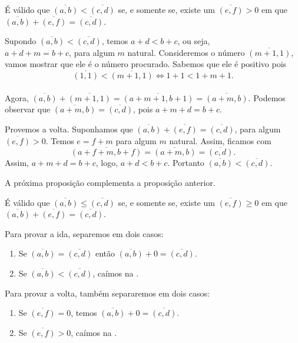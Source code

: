 \documentclass[../main.tex]{subfiles}
\begin{document}
\begin{prop}\label{int-prop-AMenorBAMaisCIgualB}
    É válido que $\overline{(a,b)} < \overline{(c,d)}$ se, e somente se, existe um $\overline{(e,f)} > 0$ em que  $\overline{(a,b)} + \overline{(e,f)} = \overline{(c,d)}$.
\end{prop}
\begin{dem}
    Supondo $\overline{(a,b)} < \overline{(c,d)}$, temos $a+d < b+c$, ou seja, \\ 
    $a+d + m = b+c$, para algum $m$ natural. Consideremos o número $\overline{(m+1, 1)}$, vamos mostrar que ele é o número procurado. Sabemos que ele é positivo pois 
    \[ \overline{(1,1)} < \overline{(m+1, 1)} \iff 1+1 < 1+m+1. \] \\
    Agora, $\overline{(a,b)} + \overline{(m+1,1)} = \overline{(a+m+1,b+1)} = \overline{(a+m, b)}$.
    Podemos observar que $\overline{(a+m, b)} = \overline{(c,d)}$, pois $a+m+d = b+c$.

    Provemos a volta. Suponhamos que $\overline{(a,b)} + \overline{(e,f)} = \overline{(c,d)}$, para algum $\overline{(e,f)} > 0$. Temos $e=f+m$ para algum $m$ natural. Assim, ficamos com 
    \[ \overline{(a+f+m, b+f)} = \overline{(a+m, b)} = \overline{(c,d)}. \] 
    Assim, $a+m+d = b+c$, logo, $a+d < b+c$. Portanto $ \overline{(a,b)} < \overline{(c,d)}$.
\end{dem}

A próxima proposição complementa a proposição anterior.
\begin{prop}\label{int-prop-diferencaPositiva}
    É válido que $\overline{(a,b)} \leq \overline{(c,d)}$ se, e somente se, existe um $\overline{(e,f)} \geq 0$ em que $\overline{(a,b)} + \overline{(e,f)} = \overline{(c,d)}$. 
\end{prop}
\begin{dem}
    Para provar a ida, separemos em dois casos:
    \begin{enumerate}[label=(\roman*)]
        \item Se $\overline{(a,b)} = \overline{(c,d)}$ então $\overline{(a,b)} + 0 = \overline{(c,d)}$.
        \item Se $\overline{(a,b)} < \overline{(c,d)}$, caímos na .
    \end{enumerate} 
    Para provar a volta, também separaremos em dois casos:    
    \begin{enumerate}[label=(\roman*)]
        \item Se $\overline{(e,f)} = 0$, temos $\overline{(a,b)} + 0 = \overline{(c,d)}$.
        \item Se $\overline{(e,f)} > 0$, caímos na .
    \end{enumerate} 
\end{dem}
\end{document}
